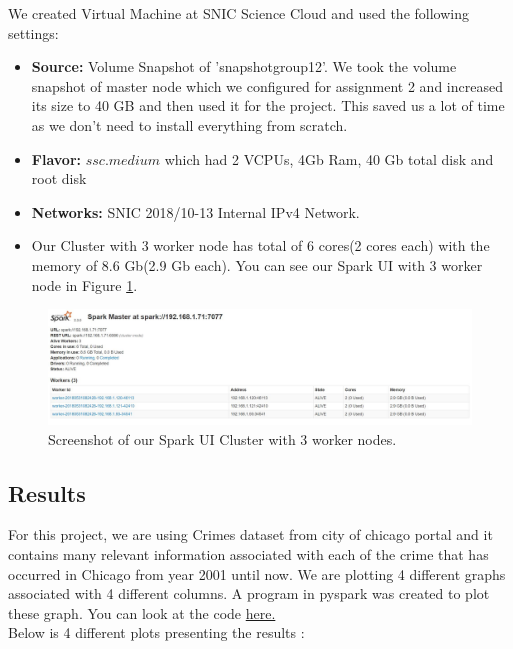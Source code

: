 We created Virtual Machine at SNIC Science Cloud \cite{snic} and used the following settings:

\begin{itemize}
    \item \textbf{Source:} Volume Snapshot of 'snapshotgroup12'. We took the volume snapshot of master node which we configured for assignment 2 and increased its size to 40 GB and then used it for the project. This saved us a lot of time as we don't need to install everything from scratch.
    \item \textbf{Flavor:} $ssc.medium$ which had 2 VCPUs, 4Gb Ram, 40 Gb total disk and root disk
    \item \textbf{Networks:} SNIC 2018/10-13 Internal IPv4 Network.
    \item Our Cluster with 3 worker node has total of 6 cores(2 cores each) with the memory of 8.6 Gb(2.9 Gb each). You can see our Spark UI with 3 worker node in Figure \ref{fig:spark_master_three}. 
\end{itemize}

\begin{figure}[H]
    \centering
    \includegraphics[width=.95\linewidth]{figures/spark_master_three.jpg}
    \caption{Screenshot of our Spark UI Cluster with 3 worker nodes.}
    \label{fig:spark_master_three}
\end{figure}


\subsection{Results}
For this project, we are using Crimes dataset\cite{cityOfChicago} from city of chicago portal and it contains many relevant information associated with each of the crime that has occurred in Chicago from year 2001 until now. We are plotting 4 different graphs associated with 4 different columns. A program in pyspark was created to plot these graph. You can look at the code \href{https://github.com/ankurshukla03/ldsaproject/blob/edit_report/code/Crimes.ipynb}{here.} \\
Below is 4 different plots presenting the results :\\

